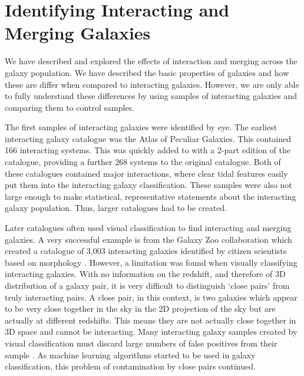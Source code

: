 \section{Identifying Interacting and Merging Galaxies}
\noindent We have described and explored the effects of interaction and merging across the galaxy population. We have described the basic properties of galaxies and how these are differ when compared to interacting galaxies. However, we are only able to fully understand these differences by using samples of interacting galaxies and comparing them to control samples.

The first samples of interacting galaxies were identified by eye. The earliest interacting galaxy catalogue was the \citet{1966ApJS...14....1A} Atlas of Peculiar Galaxies. This contained 166 interacting systems. This was quickly added to with a 2-part edition of the \citet{1977A&AS...28....1V} catalogue, providing a further 268 systems to the original \citet{1966ApJS...14....1A} catalogue. Both of these catalogues contained major interactions, where clear tidal features easily put them into the interacting galaxy classification. These samples were also not large enough to make statistical, representative statements about the interacting galaxy population. Thus, larger catalogues had to be created.

Later catalogues often used visual classification to find interacting and merging galaxies. A very successful example is from the Galaxy Zoo collaboration which created a catalogue of 3,003 interacting galaxies identified by citizen scientists based on morphology \citep{2010MNRAS.401.1043D}. However, a limitation was found when visually classifying interacting galaxies. With no information on the redshift, and therefore of 3D distribution of a galaxy pair, it is very difficult to distinguish `close pairs' from truly interacting pairs. A close pair, in this context, is two galaxies which appear to be very close together in the sky in the 2D projection of the sky but are actually at different redshifts. This means they are not actually close together in 3D space and cannot be interacting. Many interacting galaxy samples created by visual classification must discard large numbers of false positives from their sample \citep{2020MNRAS.492.2075B, 2022A&A...661A..52P}. As machine learning algorithms started to be used in galaxy classification, this problem of contamination by close pairs continued.

